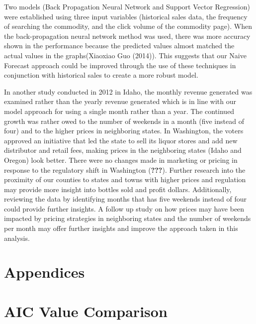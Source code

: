 \documentclass[]{elsarticle} %
\begin{document}
Two models (Back Propagation Neural Network and Support Vector
Regression) were established using three input variables (historical
sales data, the frequency of searching the commodity, and the click
volume of the commodity page). When the back-propagation neural network
method was used, there was more accuracy shown in the performance
because the predicted values almost matched the actual values in the
graphs(Xiaoxiao Guo (2014)). This suggests that our Naive Forecast
approach could be improved through the use of these techniques in
conjunction with historical sales to create a more robust model.

In another study conducted in 2012 in Idaho, the monthly revenue
generated was examined rather than the yearly revenue generated which is
in line with our model approach for using a single month rather than a
year. The continued growth was rather owed to the number of weekends in
a month (five instead of four) and to the higher prices in neighboring
states. In Washington, the voters approved an initiative that led the
state to sell its liquor stores and add new distributor and retail fees,
making prices in the neighboring states (Idaho and Oregon) look better.
There were no changes made in marketing or pricing in response to the
regulatory shift in Washington ({\textbf{???}}). Further research into
the proximity of our counties to states and towns with higher prices and
regulation may provide more insight into bottles sold and profit
dollars. Additionally, reviewing the data by identifying months that has
five weekends instead of four could provide further insights. A follow
up study on how prices may have been impacted by pricing strategies in
neighboring states and the number of weekends per month may offer
further insights and improve the approach taken in this analysis.

\newpage

\section{Appendices}\label{appendices}

\section{AIC Value Comparison}\label{aic-value-comparison}
\end{document}

